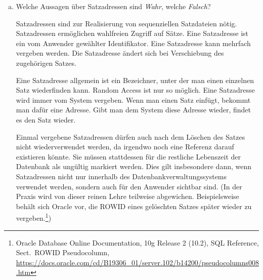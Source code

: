\begin{enumerate}[a)]
	\item Welche Aussagen über Satzadressen sind \textit{Wahr}, welche \textit{Falsch}?

    \begin{description}
        \itemmc   Satzadressen sind zur Realisierung von sequenziellen Satzdateien nötig.
        \itemmcsol Satzadressen ermöglichen wahlfreien Zugriff auf Sätze.
        \itemmc   Eine Satzadresse ist ein vom Anwender gewählter Identifikator.
        \itemmc   Eine Satzadresse kann mehrfach vergeben werden.
        \itemmc   Die Satzadresse ändert sich bei Verschiebung des zugehörigen Satzes.
    \end{description}

	\begin{solution}
	Eine Satzadresse allgemein ist ein Bezeichner, unter der man einen einzelnen Satz wiederfinden kann. Random Access ist nur so möglich. Eine Satzadresse wird immer vom System vergeben. Wenn man einen Satz einfügt, bekommt man dafür eine Adresse. Gibt man dem System diese Adresse wieder, findet es den Satz wieder.

	Einmal vergebene Satzadressen dürfen auch nach dem Löschen des Satzes nicht wiederverwendet werden, da irgendwo noch eine Referenz darauf existieren könnte. Sie müssen stattdessen für die restliche Lebenszeit der Datenbank als ungültig markiert werden. Dies gilt insbesondere dann, wenn Satzadressen nicht nur innerhalb des Datenbankverwaltungssystems verwendet werden, sondern auch für den Anwender sichtbar sind. (In der Praxis wird von dieser reinen Lehre teilweise abgewichen. Beispielsweise behält sich Oracle vor, die ROWID eines gelöschten Satzes später wieder zu vergeben.\footnote{Oracle Database Online Documentation, 10g Release 2 (10.2), SQL Reference, Sect.\ ROWID Pseudocolumn, \url{https://docs.oracle.com/cd/B19306_01/server.102/b14200/pseudocolumns008.htm}})
	\end{solution}
\end{enumerate}



